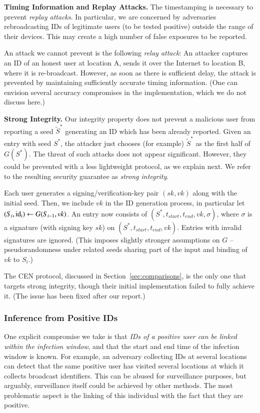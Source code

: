 \documentclass{article}
\begin{document}
{\bf Timing Information and Replay Attacks.} 
The timestamping is necessary to prevent {\em replay attacks}. In particular, we are concerned by adversaries rebroadcasting IDs of legitimate users (to be tested positive) outside the range of their devices. This may create a high number of false exposures to be reported. 

An attack we cannot prevent is the following {\em relay attack}: An attacker captures an ID of an honest user at location A, sends it over the Internet to location B, where it is re-broadcast.  However, as soon as there is sufficient delay, the attack is prevented by maintaining sufficiently accurate timing information. (One can envision several accuracy compromises in the implementation, which we do not discuss here.)

{\bf Strong Integrity.} Our integrity property does not prevent a malicious user from reporting a seed $\widetilde{S}^*$ generating an ID which has been already reported. Given an entry with seed $S^*$, the attacker just chooses (for example) $\widetilde{S}^*$ as the first half of $G(S^*)$. The threat of such attacks does not appear significant. However, they could be prevented with a less lightweight protocol, as we explain next. We refer to the resulting security guarantee as {\em strong integrity}. 

Each user generates a signing/verification-key pair $(sk, vk)$ along with the initial seed. Then, we include $vk$ in the ID generation process, in particular let $(S_i, \mathrm{id}_i) \gets G(S_{i-1}, vk)$. An entry now consists of $(S^*, t_{start}, t_{end}, vk, \sigma)$, where $\sigma$ is a signature (with signing key $sk$) on $(S^*, t_{start}, t_{end}, vk)$. Entries with invalid signatures are ignored. (This imposes slightly stronger assumptions on $G$ -- pseudorandomness under related seeds sharing part of the input and binding of $vk$ to $S_i$.)

The CEN protocol, discussed in Section~\ref{sec:comparisons}, is the only one that targets strong integrity, though their initial implementation failed to fully achieve it. (The issue has been fixed after our report.)

\subsubsection{Inference from Positive IDs} 

One explicit compromise we take is that {\em IDs of a positive user can be linked within the infection window}, and that the start and end time of the infection window is known. For example, an adversary collecting IDs at several locations can detect that the same positive user has visited several locations at which it collects broadcast identifiers. This can be abused for surveillance purposes, but arguably, surveillance itself could be achieved by other methods. The most problematic aspect is the linking of this individual with the fact that they are positive. 
\end{document}
